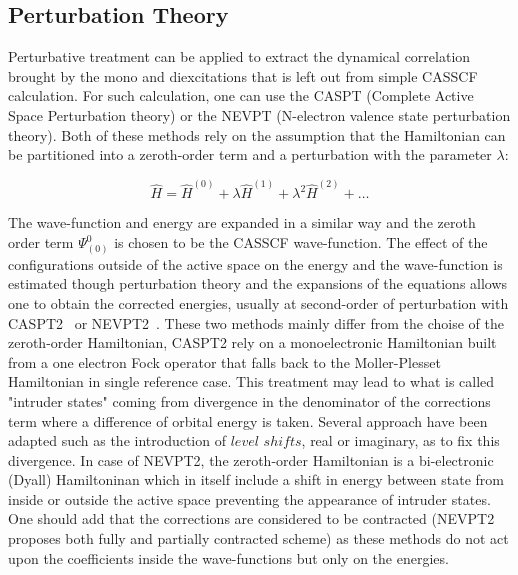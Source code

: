 \documentclass[12pt]{report}
\numberwithin{equation}{section}
\begin{document}
\subsection{Perturbation Theory}

Perturbative treatment can be applied to extract the dynamical correlation brought by the mono and diexcitations that is left out from simple CASSCF calculation. 
For such calculation, one can use the CASPT (Complete Active Space Perturbation theory) or the NEVPT (N-electron valence state perturbation theory). Both of these methods rely on the assumption that the Hamiltonian can be partitioned into a zeroth-order term and a perturbation with the parameter $\lambda$:

\begin{equation}
    \hat{H}=\hat{H}^{(0)}+\lambda\hat{H}^{(1)}+\lambda^2 \hat{H}^{(2)}+\ldots
\end{equation}


The wave-function and energy are expanded in a similar way and the zeroth order term $\Psi_{(0)}^{0}$ is chosen to be the CASSCF wave-function. 
The effect of the configurations outside of the active space on the energy and the wave-function is estimated though perturbation theory and the expansions of the equations allows one to obtain the corrected energies,
usually at second-order of perturbation with CASPT2~\cite{noauthor_second-order_nodate} or NEVPT2~\cite{angeli_introduction_2001,angeli_n-electron_2002}. These two methods mainly differ from the choise of the zeroth-order Hamiltonian, CASPT2 rely on a monoelectronic Hamiltonian built from a one electron Fock operator that falls back to the Moller-Plesset Hamiltonian in single reference case. 
This treatment may lead to what is called "intruder states" coming from divergence in the denominator of the corrections term where a difference of orbital energy is taken. Several approach have been adapted such as the introduction of  $level$ $shifts$, real or imaginary, as to fix this divergence.
In case of NEVPT2, the zeroth-order Hamiltonian is a bi-electronic (Dyall) Hamiltoninan which in itself include a shift in energy between state from inside or outside the active space preventing the appearance of intruder states.
One should add that the corrections are considered to be contracted (NEVPT2 proposes both fully and partially contracted scheme) as these methods do not act upon the coefficients inside the wave-functions but only on the energies.
\end{document}
